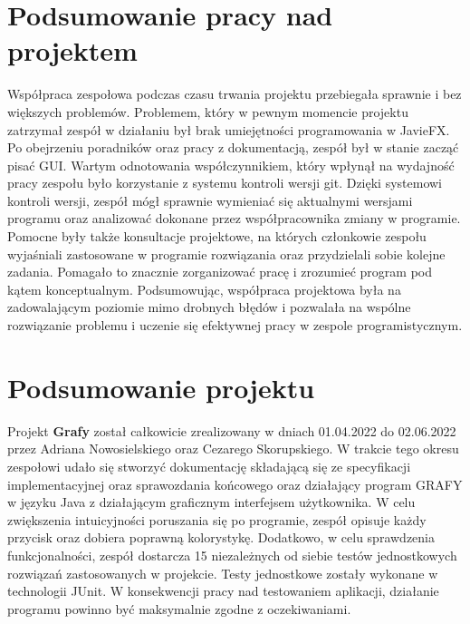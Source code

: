 \documentclass[10pt]{article}
\begin{document}
\section{Podsumowanie pracy nad projektem}
Współpraca zespołowa podczas czasu trwania projektu przebiegała sprawnie i bez większych problemów. Problemem, który w pewnym momencie projektu zatrzymał zespół w działaniu był brak umiejętności programowania w JavieFX. Po obejrzeniu poradników oraz pracy z dokumentacją, zespół był w stanie zacząć pisać GUI. Wartym odnotowania współczynnikiem, który wpłynął na wydajność pracy zespołu było korzystanie z systemu kontroli wersji git. Dzięki systemowi kontroli wersji, zespół mógł sprawnie wymieniać się aktualnymi wersjami programu oraz analizować dokonane przez współpracownika zmiany w programie. Pomocne były także konsultacje projektowe, na których członkowie zespołu wyjaśniali zastosowane w programie rozwiązania oraz przydzielali sobie kolejne zadania. Pomagało to znacznie zorganizować pracę i zrozumieć program pod kątem konceptualnym. Podsumowując, współpraca projektowa była na zadowalającym poziomie mimo drobnych błędów i pozwalała na wspólne rozwiązanie problemu i uczenie się efektywnej pracy w zespole programistycznym.
\section{Podsumowanie projektu}
Projekt \textbf{Grafy} został całkowicie zrealizowany w dniach 01.04.2022 do 02.06.2022 przez Adriana Nowosielskiego oraz Cezarego Skorupskiego. W trakcie tego okresu zespołowi udało się stworzyć dokumentację składającą się ze specyfikacji implementacyjnej oraz sprawozdania końcowego oraz działający program GRAFY w języku Java z działającym graficznym interfejsem użytkownika. W celu zwiększenia intuicyjności poruszania się po programie, zespół opisuje każdy przycisk oraz dobiera poprawną kolorystykę. Dodatkowo, w celu sprawdzenia funkcjonalności, zespół dostarcza 15 niezależnych od siebie testów jednostkowych rozwiązań zastosowanych w projekcie. Testy jednostkowe zostały wykonane w technologii JUnit. W konsekwencji pracy nad testowaniem aplikacji, działanie programu powinno być maksymalnie zgodne z oczekiwaniami.
\end{document}
